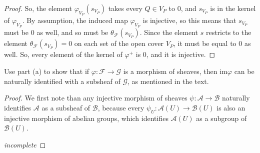\documentclass[12pt]{article}
\theoremstyle{definition}
\newenvironment{problem}[2][Problem]{\begin{trivlist}
\item[\hskip \labelsep {\bfseries #1}\hskip \labelsep {\bfseries #2.}]}{\end{trivlist}}
\begin{document}
\begin{problem}{4}
\begin{enumerate}[label=(\alph*)]
\begin{proof}
    So, the element $\varphi_{V_P}(s_{V_P})$ takes every $Q \in V_P$ to $0$, and $s_{V_P}$ is in the kernel of $\varphi_{V_P}$. By assumption, the induced map $\varphi_{V_P}$ is injective, so this means that $s_{V_P}$ must be $0$ as well, and so must be $\theta_{\mathcal{F}}(s_{V_P})$. Since the element $s$ restricts to the element $\theta_{\mathcal{F}}(s_{V_P}) = 0$ on each set of the open cover $V_P$, it must be equal to $0$ as well. So, every element of the kernel of $\varphi^{+}$ is $0$, and it is injective.
    \par 
    \end{proof}
    \begin{item}
	    Use part (a) to show that if $\varphi: \mathcal{F} \to \mathcal{G}$ is a morphism of sheaves, then $\text{im} \varphi$ can be naturally identified with a subsheaf of $\mathcal{G}$, as mentioned in the text.
	    \begin{proof}
		    We first note than any injective morphism of sheaves $\psi: \mathcal{A}\to \mathcal{B}$ naturally identifies $\mathcal{A}$ as a subsheaf of $\mathcal{B}$, because every $\psi_U: \mathcal{A}(U) \to \mathcal{B}(U)$ is also an injective morphism of abelian groups, which identifies $\mathcal{A}(U)$ as a subgroup of $\mathcal{B}(U)$. 
		    \par \textit{incomplete}
	    \end{proof}
    \end{item}
\end{enumerate}
\end{problem}
\end{document}
